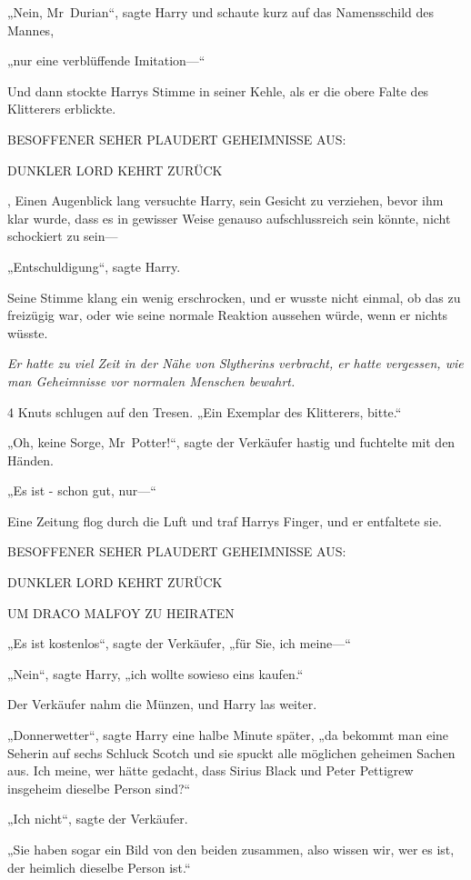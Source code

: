 {„Nein, Mr~Durian“, sagte Harry und schaute kurz auf das Namensschild des Mannes,

„nur eine verblüffende Imitation—“

Und dann stockte Harrys Stimme in seiner Kehle, als er die obere Falte des Klitterers erblickte.

BESOFFENER SEHER PLAUDERT GEHEIMNISSE AUS:

DUNKLER LORD KEHRT ZURÜCK

, Einen Augenblick lang versuchte Harry, sein Gesicht zu verziehen, bevor ihm klar wurde, dass es in gewisser Weise genauso aufschlussreich sein könnte, nicht schockiert zu sein—

„Entschuldigung“, sagte Harry.

Seine Stimme klang ein wenig erschrocken, und er wusste nicht einmal, ob das zu freizügig war, oder wie seine normale Reaktion aussehen würde, wenn er nichts wüsste.

\emph{Er hatte zu viel Zeit in der Nähe von Slytherins verbracht, er hatte vergessen, wie man Geheimnisse vor normalen Menschen bewahrt.}

4 Knuts schlugen auf den Tresen. „Ein Exemplar des Klitterers, bitte.“

„Oh, keine Sorge, Mr~Potter!“, sagte der Verkäufer hastig und fuchtelte mit den Händen.

„Es ist - schon gut, nur—“

Eine Zeitung flog durch die Luft und traf Harrys Finger, und er entfaltete sie.

BESOFFENER SEHER PLAUDERT GEHEIMNISSE AUS:

DUNKLER LORD KEHRT ZURÜCK

UM DRACO MALFOY ZU HEIRATEN

„Es ist kostenlos“, sagte der Verkäufer, „für Sie, ich meine—“

„Nein“, sagte Harry, „ich wollte sowieso eins kaufen.“

Der Verkäufer nahm die Münzen, und Harry las weiter.

„Donnerwetter“, sagte Harry eine halbe Minute später, „da bekommt man eine Seherin auf sechs Schluck Scotch und sie spuckt alle möglichen geheimen Sachen aus. Ich meine, wer hätte gedacht, dass Sirius Black und Peter Pettigrew insgeheim dieselbe Person sind?“

„Ich nicht“, sagte der Verkäufer.

„Sie haben sogar ein Bild von den beiden zusammen, also wissen wir, wer es ist, der heimlich dieselbe Person ist.“

}
